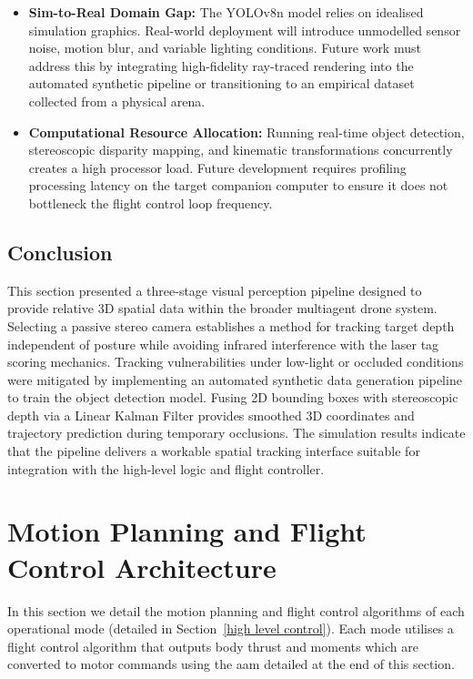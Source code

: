 \documentclass{report_template_oxford}
\begin{document}
\begin{itemize}
    \setlength{\itemsep}{0pt}
    \setlength{\parskip}{0pt}
    \item \textbf{Sim-to-Real Domain Gap:} The YOLOv8n model relies on idealised simulation graphics. Real-world deployment will introduce unmodelled sensor noise, motion blur, and variable lighting conditions. Future work must address this by integrating high-fidelity ray-traced rendering into the automated synthetic pipeline or transitioning to an empirical dataset collected from a physical arena.
    \item \textbf{Computational Resource Allocation:} Running real-time object detection, stereoscopic disparity mapping, and kinematic transformations concurrently creates a high processor load. Future development requires profiling processing latency on the target companion computer to ensure it does not bottleneck the flight control loop frequency.
\end{itemize}

\subsection{Conclusion}
This section presented a three-stage visual perception pipeline designed to provide relative 3D spatial data within the broader multiagent drone system. Selecting a passive stereo camera establishes a method for tracking target depth independent of posture while avoiding infrared interference with the laser tag scoring mechanics. Tracking vulnerabilities under low-light or occluded conditions were mitigated by implementing an automated synthetic data generation pipeline to train the object detection model. Fusing 2D bounding boxes with stereoscopic depth via a Linear Kalman Filter provides smoothed 3D coordinates and trajectory prediction during temporary occlusions. The simulation results indicate that the pipeline delivers a workable spatial tracking interface suitable for integration with the high-level logic and flight controller.


\newpage
\section{Motion Planning and Flight Control Architecture}
\label{motionPlanning}

In this section we detail the motion planning and flight control algorithms of each operational mode (detailed in Section~\ref{high level control}). Each mode utilises a flight control algorithm that outputs body thrust and moments which are converted to motor commands using the \gls{aam} detailed at the end of this section.
\end{document}
